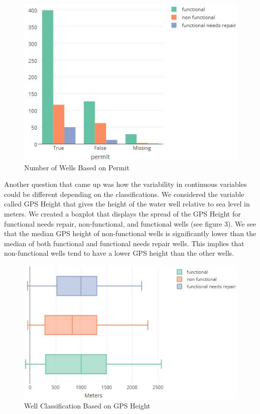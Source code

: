 \documentclass[10pt]{SelfArx} %
\begin{document}
\setlength{\belowcaptionskip}{10pt}
\begin{figure}[ht]\centering
\includegraphics[width=\linewidth]{permit.png}
\caption{Number of Wells Based on Permit}
\label{fig:permit}
\end{figure}

Another question that came up was how the variability in continuous variables could be different depending on the classifications. We considered the variable called GPS Height that gives the height of the water well relative to sea level in meters. We created a boxplot that displays the spread of the GPS Height for functional needs repair, non-functional, and functional wells (see figure 3). We see that the median GPS height of non-functional wells is significantly lower than the median of both functional and functional needs repair wells. This implies that non-functional wells tend to have a lower GPS height than the other wells.
\break

\setlength{\belowcaptionskip}{-15pt}
\begin{figure}[ht]\centering
\includegraphics[width=\linewidth]{boxplot2.png}
\caption{Well Classification Based on GPS Height}
\label{fig:GPS}
\end{figure}
\end{document}
